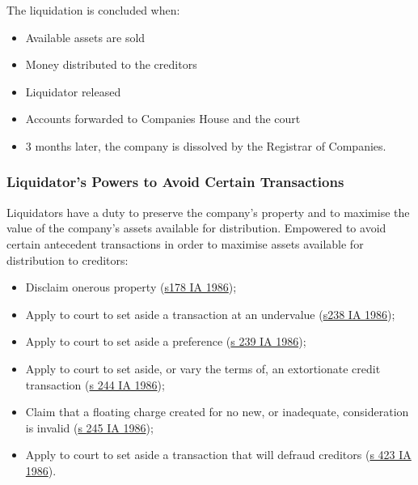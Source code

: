\documentclass[
]{article}
\providecommand{\tightlist}{%
  \setlength{\itemsep}{0pt}\setlength{\parskip}{0pt}}
\begin{document}
The liquidation is concluded when:

\begin{itemize}
\tightlist
\item
  Available assets are sold
\item
  Money distributed to the creditors
\item
  Liquidator released
\item
  Accounts forwarded to Companies House and the court
\item
  3 months later, the company is dissolved by the Registrar of
  Companies.
\end{itemize}

\hypertarget{liquidators-powers-to-avoid-certain-transactions}{%
\subsubsection{Liquidator's Powers to Avoid Certain
Transactions}\label{liquidators-powers-to-avoid-certain-transactions}}

Liquidators have a duty to preserve the company's property and to
maximise the value of the company's assets available for distribution.
Empowered to avoid certain antecedent transactions in order to maximise
assets available for distribution to creditors:

\begin{itemize}
\tightlist
\item
  Disclaim onerous property
  (\href{https://www.legislation.gov.uk/ukpga/1986/45/section/178}{s178
  IA 1986});
\item
  Apply to court to set aside a transaction at an undervalue
  (\href{https://www.legislation.gov.uk/ukpga/1986/45/section/238}{s238
  IA 1986});
\item
  Apply to court to set aside a preference
  (\href{https://www.legislation.gov.uk/ukpga/1986/45/section/239}{s 239
  IA 1986});
\item
  Apply to court to set aside, or vary the terms of, an extortionate
  credit transaction
  (\href{https://www.legislation.gov.uk/ukpga/1986/45/section/244}{s 244
  IA 1986});
\item
  Claim that a floating charge created for no new, or inadequate,
  consideration is invalid
  (\href{https://www.legislation.gov.uk/ukpga/1986/45/section/245}{s 245
  IA 1986});
\item
  Apply to court to set aside a transaction that will defraud creditors
  (\href{https://www.legislation.gov.uk/ukpga/1986/45/section/423}{s 423
  IA 1986}).
\end{itemize}
\end{document}
